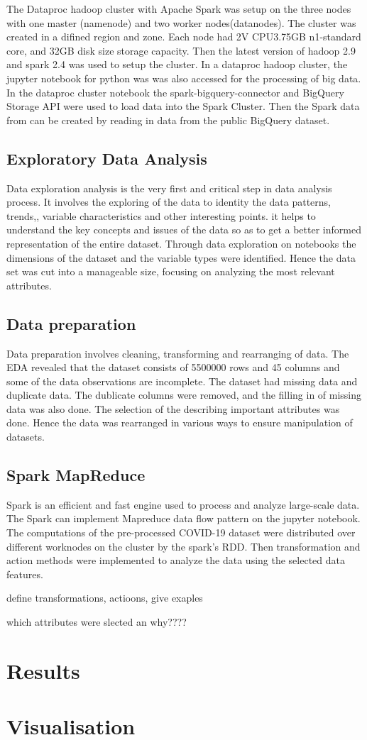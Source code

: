 \documentclass[12pt,letterpaper, twoside]{article}
\begin{document}
The Dataproc hadoop cluster with Apache Spark was setup on the three nodes with one master (namenode) and two worker nodes(datanodes). The cluster was created in a difined region and zone. Each node had 2V CPU3.75GB n1-standard core, and 32GB disk size storage capacity. Then the latest version of hadoop 2.9 and spark 2.4 was used to setup the cluster. In a dataproc hadoop cluster, the jupyter notebook for python was was also accessed for the processing of big data.  In the dataproc cluster notebook the spark-bigquery-connector and BigQuery Storage API were used to  load data into the Spark Cluster. Then the Spark data from can be created by reading in data from the public BigQuery dataset. 

\subsection{ Exploratory Data Analysis}
Data exploration analysis is the very first and critical step in data analysis process. It involves the exploring of the data to identity the data patterns, trends,, variable characteristics and other interesting points. it helps to understand the key concepts and issues of the data so as to get a better informed representation of the entire dataset. Through data exploration on notebooks the dimensions of the dataset and the variable types were identified. Hence the data set was cut into a manageable size, focusing on analyzing the most relevant attributes.  

\subsection{Data preparation}
Data preparation involves cleaning, transforming and rearranging of data. The EDA revealed that the dataset consists of 5500000 rows and 45 columns and some of the data observations are incomplete. The dataset had missing data and duplicate data. The dublicate columns were removed, and the filling in of missing data was also done. The selection of the describing important  attributes was done. Hence the data was rearranged in various ways to ensure  manipulation of datasets. 


\subsection{Spark MapReduce}
Spark is an efficient and fast engine used to process and analyze large-scale data. The Spark can implement Mapreduce data flow pattern on the jupyter notebook. The computations of the pre-processed  COVID-19 dataset were distributed over different worknodes on the cluster by the spark's RDD. Then transformation and action methods were implemented to analyze the data using the selected data features.

define transformations, actioons, give exaples

which attributes were slected an why????

\section{Results}
\section{Visualisation}
\end{document}
